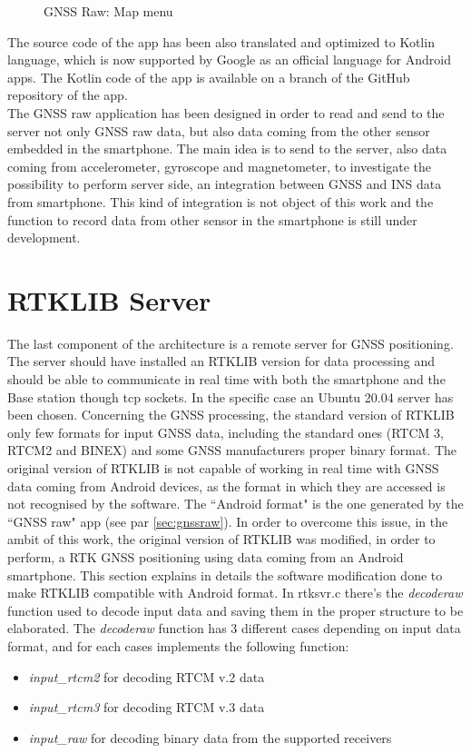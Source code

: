 \begin{figure}[H]
	\caption{GNSS Raw: Map menu}
	\label{FIG:gnssraw_map} 
\end{figure}
The source code of the app has been also translated and optimized to Kotlin language, which is now supported by Google as an official language for Android apps. The Kotlin code of the app is available on a branch of the GitHub repository of the app. \\
The GNSS raw application has been designed in order to read and send to the server not only GNSS raw data, but also data coming from the other sensor embedded in the smartphone. The main idea is to send to the server, also data coming from accelerometer, gyroscope and magnetometer, to investigate the possibility to perform server side, an integration between GNSS and INS data from smartphone. This kind of integration is not object of this work and the function to record data from other sensor in the smartphone is still under development.
%
\section{RTKLIB Server}
\label{sec:modified_rtklib}
The last component of the architecture is a remote server for GNSS positioning. The server should have installed an RTKLIB version for data processing and should be able to communicate in real time with both the smartphone and the Base station though tcp sockets. In the specific case an Ubuntu 20.04 server has been chosen. Concerning the GNSS processing, the standard version of RTKLIB only few formats for input GNSS data, including the standard ones (RTCM 3, RTCM2 and BINEX) and some GNSS manufacturers proper binary format. The original version of RTKLIB is not capable of working in real time with GNSS data coming from Android devices, as the format in which they are accessed is not recognised by the software. The ``Android format" is the one generated by the ``GNSS raw" app (see par \ref{sec:gnssraw}). In order to overcome this issue, in the ambit of this work, the original version of RTKLIB was modified, in order to perform, a RTK GNSS positioning using data coming from an Android smartphone.  This section explains in details the software modification done to make RTKLIB compatible with Android format. In rtksvr.c there's the \textit{decoderaw} function used to decode input data and saving them in the proper structure to be elaborated. The \textit{decoderaw} function has 3 different cases depending on input data format, and for each cases implements the following function:
\begin{itemize}
\item \textit{input\_rtcm2} for decoding RTCM v.2 data
\item \textit{input\_rtcm3} for decoding RTCM v.3 data
\item \textit{input\_raw} for decoding binary data from the supported receivers
\end{itemize}

